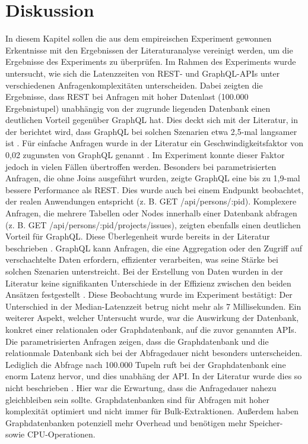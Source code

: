 \chapter{Diskussion} %
\label{sec:diskussion}
In diesem Kapitel sollen die aus dem empireischen Experiment gewonnen Erkentnisse mit den Ergebnissen der Literaturanalyse vereinigt werden, um die Ergebnisse des Experiments zu überprüfen.
\newline
\noindent
Im Rahmen des Experiments wurde untersucht, wie sich die Latenzzeiten von REST- und GraphQL-APIs unter verschiedenen Anfragenkomplexitäten unterscheiden. Dabei zeigten die Ergebnisse, dass REST bei Anfragen mit hoher Datenlast (100.000 Ergebnistupel) unabhängig von der zugrunde liegenden Datenbank einen deutlichen Vorteil gegenüber GraphQL hat. Dies deckt sich mit der Literatur, in der berichtet wird, dass GraphQL bei solchen Szenarien etwa 2,5-mal langsamer ist \citep{restvsgraphql}.
\newline
\noindent
Für einfache Anfragen wurde in der Literatur ein Geschwindigkeitsfaktor von 0,02 zugunsten von GraphQL genannt \citep{migrategraphql}. Im Experiment konnte dieser Faktor jedoch in vielen Fällen übertroffen werden. Besonders bei parametrisierten Anfragen, die ohne Joins ausgeführt wurden, zeigte GraphQL eine bis zu 1,9-mal bessere Performance als REST. Dies wurde auch bei einem Endpunkt beobachtet, der realen Anwendungen entspricht (z. B. GET /api/persons/:pid).
\newline
\noindent
Komplexere Anfragen, die mehrere Tabellen oder Nodes innerhalb einer Datenbank abfragen (z. B. GET /api/persons/:pid/projects/issues), zeigten ebenfalls einen deutlichen Vorteil für GraphQL. Diese Überlegenheit wurde bereits in der Literatur beschrieben \citep{graphqlreplacerest}. GraphQL kann Anfragen, die eine Aggregation oder den Zugriff auf verschachtelte Daten erfordern, effizienter verarbeiten, was seine Stärke bei solchen Szenarien unterstreicht.
\newline
\noindent
Bei der Erstellung von Daten wurden in der Literatur keine signifikanten Unterschiede in der Effizienz zwischen den beiden Ansätzen festgestellt \citep{graphqlreplacerest}. Diese Beobachtung wurde im Experiment bestätigt: Der Unterschied in der Median-Latenzzeit betrug nicht mehr als 7 Millisekunden.
\newline
\noindent
Ein weiterer Aspekt, welcher Untersucht wurde, war die Auswirkung der Datenbank, konkret einer relationalen oder Graphdatenbank, auf die zuvor genannten APIs. Die parametrisierten Anfragen zeigen, dass die Graphdatenbank und die relationmale Datenbank sich bei der Abfragedauer nicht besonders unterscheiden. Lediglich die Abfrage nach 100.000 Tupeln ruft bei der Graphdatenbank eine enorm Latenz hervor, und dies unabhäng der API. In der Literatur wurde dies so nicht beschrieben \citep{graphrelationaldb}. Hier war die Erwartung, dass die Anfragedauer nahezu gleichbleiben sein sollte. Graphdatenbanken sind für Abfragen mit hoher komplexität optimiert und nicht immer für Bulk-Extraktionen. Außerdem haben Graphdatenbanken potenziell mehr Overhead und benötigen mehr Speicher- sowie CPU-Operationen.

